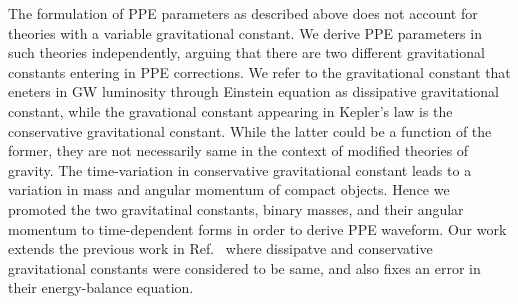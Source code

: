 \documentclass[prd,twocolumn,nofootinbib]{revtex4-1}
\begin{document}
The formulation of PPE parameters as described above does not account for theories with a variable gravitational constant. We derive PPE parameters in such theories independently, arguing that there are two different gravitational constants entering in PPE corrections. We refer to the gravitational constant that eneters in GW luminosity through Einstein equation as dissipative gravitational constant, while the gravational constant appearing in Kepler's law is the conservative gravitational constant. While the latter could be a function of the former, they are not necessarily same in the context of modified theories of gravity. The time-variation in conservative gravitational constant leads to a variation in mass and angular momentum of compact objects. Hence we promoted the two gravitatinal constants, binary masses, and their angular momentum to time-dependent forms in order to derive PPE waveform. Our work extends the previous work in Ref.~\cite{Yunes:2009bv} where dissipatve and conservative gravitational constants were considered to be same, and also fixes an error in their energy-balance equation.
\end{document}
